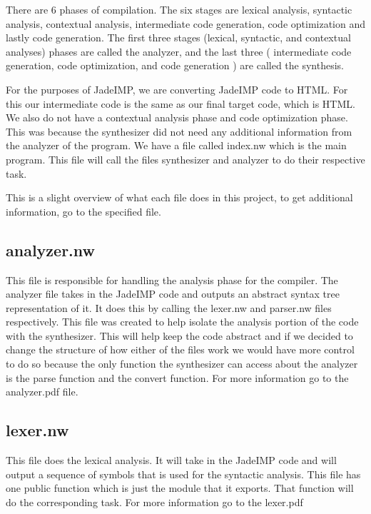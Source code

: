\documentclass{article}
\begin{document}
There are 6 phases of compilation. The six stages are lexical analysis, syntactic analysis, contextual analysis, intermediate code generation, code optimization and lastly code generation. The first three stages (lexical, syntactic, and contextual analyses) phases are called the analyzer, and the last three ( intermediate code generation, code optimization, and code generation ) are called the synthesis.

For the purposes of JadeIMP, we are converting JadeIMP code to HTML. For this our intermediate code is the same as our final target code, which is HTML. We also do not have a contextual analysis phase and code optimization phase. This was because the synthesizer did not need any additional information from the analyzer of the program. We have a file called index.nw which is the main program. This file will call the files synthesizer and analyzer to do their respective task.

This is a slight overview of what each file does in this project, to get additional information, go to the specified file.

\subsection{analyzer.nw}

  This file is responsible for handling the analysis phase for the compiler. The analyzer file takes in the JadeIMP code and outputs an abstract syntax tree representation of it. It does this by calling the lexer.nw and parser.nw files respectively. This file was created to help isolate the analysis portion of the code with the synthesizer. This will help keep the code abstract and if we decided to change the structure of how either of the files work we would have more control to do so because the only function the synthesizer can access about the analyzer is the parse function and the convert function. For more information go to the analyzer.pdf file.

\subsection{lexer.nw}

  This file does the lexical analysis. It will take in the JadeIMP code and will output a sequence of symbols that is used for the syntactic analysis. This file has one public function which is just the module that it exports. That function will do the corresponding task. For more information go to the lexer.pdf
\end{document}

